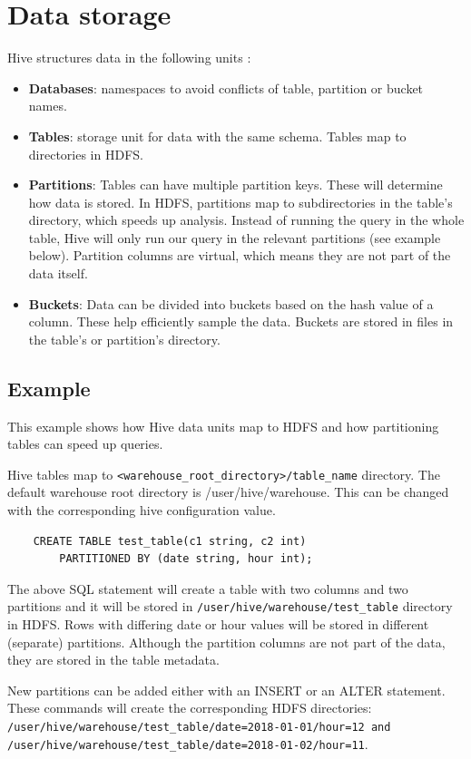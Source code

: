\section{Data storage}
Hive structures data in the following units  \cite{Hive-paper, Hive-apache}:
\begin{itemize}
\item \textbf{Databases}: namespaces to avoid conflicts of table, partition or bucket names.
\item \textbf{Tables}: storage unit for data with the same schema. Tables map to directories in HDFS.
\item \textbf{Partitions}: Tables can have multiple partition keys. These will determine how data is stored. In HDFS, partitions map to subdirectories in the table's directory, which speeds up analysis. Instead of running the query in the whole table, Hive will only run our query in the relevant partitions (see example below). Partition columns are virtual, which means they are not part of the data itself.
\item \textbf{Buckets}: Data can be divided into buckets based on the hash value of a column. These help efficiently sample the data. Buckets are stored in files in the table's or partition's directory.
\end{itemize}

\subsection{Example}
This example shows how Hive data units map to HDFS and how partitioning tables can speed up queries.

Hive tables map to \texttt{<warehouse\_root\_directory>/table\_name} directory. The default warehouse root directory is /user/hive/warehouse. This can be changed with the corresponding hive configuration value.
\begin{lstlisting}
	CREATE TABLE test_table(c1 string, c2 int) 
		PARTITIONED BY (date string, hour int);
\end{lstlisting}

The above SQL statement will create a table with two columns and two partitions and it will be stored in  \texttt{/user/hive/warehouse/test\_table} directory in HDFS. Rows with differing date or hour values will be stored in different (separate) partitions. Although the partition columns are not part of the data, they are stored in the table metadata. 

New partitions can be added either with an INSERT or an ALTER statement. These commands will create the corresponding HDFS directories: 
\texttt{/user/hive/warehouse/test\_table/date=2018-01-01/hour=12 and /user/hive/warehouse/test\_table/date=2018-01-02/hour=11}.

